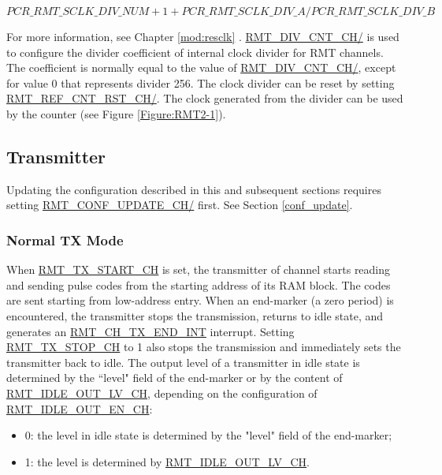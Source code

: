 \documentclass[main\_\_EN.tex]{subfiles}
\begin{document}
$$
PCR\_RMT\_SCLK\_DIV\_NUM + 1 + PCR\_RMT\_SCLK\_DIV\_A/PCR\_RMT\_SCLK\_DIV\_B
$$

For more information, see Chapter \ref{mod:resclk} \textit{}. \hyperref[fielddesc:RMTDIVCNTCHN]{RMT\_DIV\_CNT\_CH/} is used to configure the divider coefficient of internal clock divider for RMT channels. The coefficient is normally equal to the value of \hyperref[fielddesc:RMTDIVCNTCHN]{RMT\_DIV\_CNT\_CH/}, except for value 0 that represents divider 256. The clock divider can be reset by setting \hyperref[fielddesc:RMTREFCNTRSTCHN]{RMT\_REF\_CNT\_RST\_CH/}. The clock generated from the divider can be used by the counter (see Figure \ref{Figure:RMT2-1}).

\subsection{Transmitter}
\vspace{0.4cm}

\begin{tiplisting}
Updating the configuration described in this and subsequent sections requires setting \hyperref[fielddesc:RMTCONFUPDATECHN]{RMT\_CONF\_UPDATE\_CH/} first. See Section \ref{conf_update}.
\end{tiplisting}

\subsubsection{Normal TX Mode}\label{sec:normal-tx-mode}

When \hyperref[fielddesc:RMTTXSTARTCHN]{RMT\_TX\_START\_CH} is set, the transmitter of channel  starts reading and sending pulse codes from the starting address of its RAM block. The codes are sent starting from low-address entry. 
When an end-marker (a zero period) is encountered, the transmitter stops the transmission, returns to idle state, and generates an  \hyperref[int:RMTCHnTXENDINT]{RMT\_CH\_TX\_END\_INT} interrupt. Setting \hyperref[fielddesc:RMTTXSTOPCHN]{RMT\_TX\_STOP\_CH} to 1 also stops the transmission and immediately sets the transmitter back to idle. 
The output level of a transmitter in idle state is determined by the ``level" field of the end-marker or by the content of  \hyperref[fielddesc:RMTIDLEOUTLVCHN]{RMT\_IDLE\_OUT\_LV\_CH}, depending on the configuration of \hyperref[fielddesc:RMTIDLEOUTENCHN]{RMT\_IDLE\_OUT\_EN\_CH}:
\begin{itemize}
    \item 0: the level in idle state is determined by the "level" field of the end-marker;
    \item 1: the level is determined by \hyperref[fielddesc:RMTIDLEOUTLVCHN]{RMT\_IDLE\_OUT\_LV\_CH}.
\end{itemize}
\end{document}
